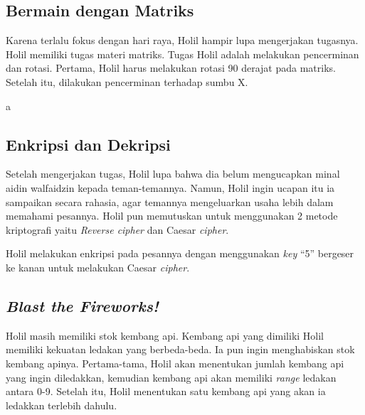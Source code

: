 \documentclass{subfiles}
\begin{document}
\subsection{Bermain dengan Matriks}
Karena terlalu fokus dengan hari raya, Holil hampir lupa mengerjakan tugasnya. Holil memiliki tugas materi matriks. Tugas Holil adalah melakukan pencerminan dan rotasi. Pertama, Holil harus melakukan rotasi 90 derajat pada matriks. Setelah itu, dilakukan pencerminan terhadap sumbu X.

{\color{White}a}\vspace{-2.5ex}

\subsection{Enkripsi dan Dekripsi}
Setelah mengerjakan tugas, Holil lupa bahwa dia belum mengucapkan minal aidin walfaidzin kepada teman-temannya. Namun, Holil ingin ucapan itu ia sampaikan secara rahasia, agar temannya mengeluarkan usaha lebih dalam memahami pesannya. Holil pun memutuskan untuk menggunakan 2 metode kriptografi yaitu \textit{Reverse cipher} dan Caesar \textit{cipher}.

Holil melakukan enkripsi pada pesannya dengan menggunakan \textit{key} ``5'' bergeser ke kanan untuk melakukan Caesar \textit{cipher}.

\subsection{\textit{Blast the Fireworks!}}
Holil masih memiliki stok kembang api. Kembang api yang dimiliki Holil memiliki kekuatan ledakan yang berbeda-beda. Ia pun ingin menghabiskan stok kembang apinya. Pertama-tama, Holil akan menentukan jumlah kembang api yang ingin diledakkan, kemudian kembang api akan memiliki \textit{range} ledakan antara 0-9. Setelah itu, Holil menentukan satu kembang api yang akan ia ledakkan terlebih dahulu.
\end{document}
